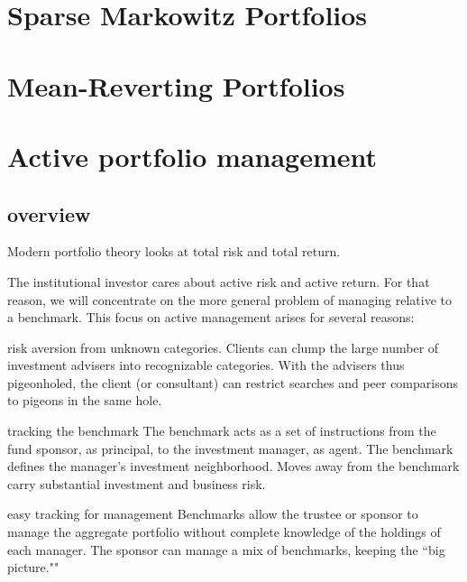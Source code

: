 \documentclass[presentation]{beamer}
\begin{document}
\section{Sparse Markowitz Portfolios}
\label{sec:orgheadline1}

\section{Mean-Reverting Portfolios}
\label{sec:orgheadline1}

\section{Active portfolio management}
\label{sec:orgheadline5}

\subsection{overview}
\label{sec:orgheadline4}
Modern portfolio theory looks at total risk and total return.

The institutional investor cares about active risk and active return.
For that reason, we will concentrate on the more general problem of managing relative to a benchmark.
This focus on active management arises for several \alert{reasons}:

\begin{frame}[label={sec:orgheadline1}]{risk aversion from unknown categories.}
Clients can clump the large number of investment advisers into recognizable categories. With the advisers thus pigeonholed, the client (or consultant) can restrict searches and peer comparisons to pigeons in the same hole.
\end{frame}

\begin{frame}[label={sec:orgheadline2}]{tracking the benchmark}
The benchmark acts as a set of instructions from the fund sponsor, as principal, to the investment manager, as agent. The benchmark defines the manager’s investment neighborhood. Moves away from the benchmark carry substantial investment and business risk.
\end{frame}

\begin{frame}[label={sec:orgheadline3}]{easy tracking for management}
Benchmarks allow the trustee or sponsor to manage the aggregate portfolio without complete knowledge of the holdings of each manager. The sponsor can manage a mix of benchmarks, keeping the “big picture.""
\end{frame}
\end{document}
